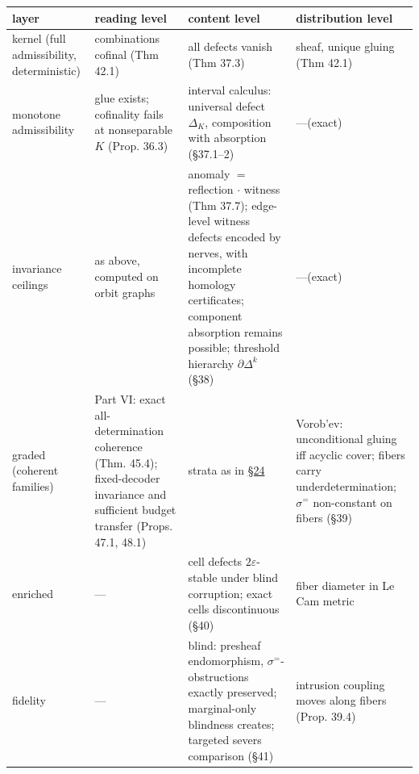{\def\LTcaptype{none} %
\begin{longtable}[]{@{}
  >{\raggedright\arraybackslash}p{}
  >{\raggedright\arraybackslash}p{}
  >{\raggedright\arraybackslash}p{}
  >{\raggedright\arraybackslash}p{}@{}}
\toprule\noalign{}
\begin{minipage}[b]{\linewidth}\raggedright
layer
\end{minipage} & \begin{minipage}[b]{\linewidth}\raggedright
reading level
\end{minipage} & \begin{minipage}[b]{\linewidth}\raggedright
content level
\end{minipage} & \begin{minipage}[b]{\linewidth}\raggedright
distribution level
\end{minipage} \\
\midrule\noalign{}
\endhead
\bottomrule\noalign{}
\endlastfoot
kernel (full admissibility, deterministic) & combinations cofinal (Thm 42.1) & all defects vanish (Thm 37.3) & sheaf, unique gluing (Thm 42.1) \\
monotone admissibility & glue exists; cofinality fails at nonseparable \(K\) (Prop. 36.3) & interval calculus: universal defect \(\Delta_K\), composition with absorption (§37.1--2) & ---\hspace{0pt}(exact) \\
invariance ceilings & as above, computed on orbit graphs & anomaly \(=\) reflection \(\cdot\) witness (Thm 37.7); edge-level witness defects encoded by nerves, with incomplete homology certificates; component absorption remains possible; threshold hierarchy \(\partial\Delta^k\) (§38) & ---\hspace{0pt}(exact) \\
graded (coherent families) & Part VI: exact all-determination coherence (Thm. 45.4); fixed-decoder invariance and sufficient budget transfer (Props. 47.1, 48.1) & strata as in \hyperlink{sec:24}{§24} & Vorob'ev: unconditional gluing iff acyclic cover; fibers carry underdetermination; \(\sigma^{=}\) non-constant on fibers (§39) \\
enriched & ---\hspace{0pt} & cell defects \(2\varepsilon\)-stable under blind corruption; exact cells discontinuous (§40) & fiber diameter in Le Cam metric \\
fidelity & ---\hspace{0pt} & blind: presheaf endomorphism, \(\sigma^{=}\)-obstructions exactly preserved; marginal-only blindness creates; targeted severs comparison (§41) & intrusion coupling moves along fibers (Prop. 39.4) \\
\end{longtable}
}

